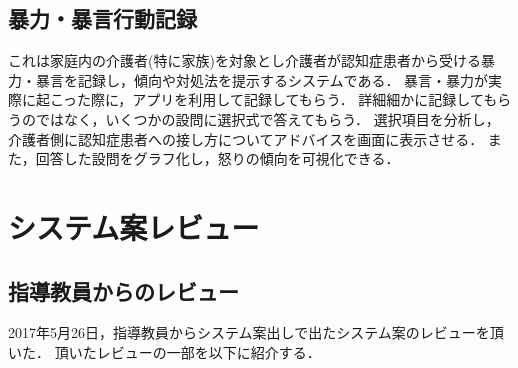 \documentclass[../report]{subfiles}
\begin{document}
\subsection{暴力・暴言行動記録}
これは家庭内の介護者(特に家族)を対象とし介護者が認知症患者から受ける暴力・暴言を記録し，傾向や対処法を提示するシステムである．
暴言・暴力が実際に起こった際に，アプリを利用して記録してもらう．
詳細細かに記録してもらうのではなく，いくつかの設問に選択式で答えてもらう．
選択項目を分析し，介護者側に認知症患者への接し方についてアドバイスを画面に表示させる．
また，回答した設問をグラフ化し，怒りの傾向を可視化できる．


\section{システム案レビュー}
\subsection{指導教員からのレビュー}
2017年5月26日，指導教員からシステム案出しで出たシステム案のレビューを頂いた．
頂いたレビューの一部を以下に紹介する．
\end{document}
